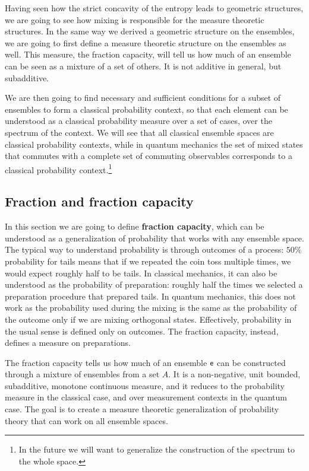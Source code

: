 Having seen how the strict concavity of the entropy leads to geometric structures, we are going to see how mixing is responsible for the measure theoretic structures. In the same way we derived a geometric structure on the ensembles, we are going to first define a measure theoretic structure on the ensembles as well. This measure, the fraction capacity, will tell us how much of an ensemble can be seen as a mixture of a set of others. It is not additive in general, but subadditive.

We are then going to find necessary and sufficient conditions for a subset of ensembles to form a classical probability context, so that each element can be understood as a classical probability measure over a set of cases, over the spectrum of the context. We will see that all classical ensemble spaces are classical probability contexts, while in quantum mechanics the set of mixed states that commutes with a complete set of commuting observables corresponds to a classical probability context.\footnote{In the future we will want to generalize the construction of the spectrum to the whole space.}

\subsection{Fraction and fraction capacity}


In this section we are going to define \textbf{fraction capacity}, which can be understood as a generalization of probability that works with any ensemble space. The typical way to understand probability is through outcomes of a process: $50\%$ probability for tails means that if we repeated the coin toss multiple times, we would expect roughly half to be tails. In classical mechanics, it can also be understood as the probability of preparation: roughly half the times we selected a preparation procedure that prepared tails. In quantum mechanics, this does not work as the probability used during the mixing is the same as the probability of the outcome only if we are mixing orthogonal states. Effectively, probability in the usual sense is defined only on outcomes. The fraction capacity, instead, defines a measure on preparations.

The fraction capacity tells us how much of an ensemble $\mathsf{e}$ can be constructed through a mixture of ensembles from a set $A$. It is a non-negative, unit bounded, subadditive, monotone continuous measure, and it reduces to the probability measure in the classical case, and over measurement contexts in the quantum case. The goal is to create a measure theoretic generalization of probability theory that can work on all ensemble spaces.

